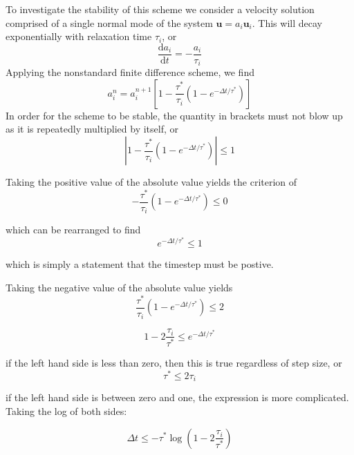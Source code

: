 \documentclass[preprint,12pt,authoryear]{elsarticle}
\newif\ifdetail
\begin{document}
To investigate the stability of this scheme we consider a velocity solution comprised of 
a single normal mode of the system $\mathbf{u} = a_i \mathbf{u}_i$.
This will decay exponentially with relaxation time $\tau_i$, or
\begin{equation}
\frac{\text{d} a_i} {\text{d}t} = - \frac{ a_i }{\tau_i} 
\end{equation}
Applying the nonstandard finite difference scheme, we find
\begin{equation}
a_i^{n} = a_i^{n+1} \left[ 1 - \frac{\tau^*}{\tau_i} \left(1-e^{-\Delta t/\tau^*} \right) \right]
\label{eq:recursion}
\end{equation}
In order for the scheme to be stable, the quantity in brackets must not blow up as it is repeatedly multiplied by itself, or 
\begin{equation}
\left| 1 - \frac{\tau^*}{\tau_i} \left(1-e^{-\Delta t/\tau^*} \right) \right| \le 1
\end{equation}

\ifdetail
Taking the positive value of the absolute value yields the criterion of 
\begin{equation}
- \frac{\tau^*}{\tau_i} \left(1-e^{-\Delta t/\tau^*} \right) \le 0
\end{equation}

which can be rearranged to find
\begin{equation}
e^{-\Delta t/\tau^*} \le 1
\end{equation}

which is simply a statement that the timestep must be postive.

Taking the negative value of the absolute value yields
\begin{equation}
  \frac{\tau^*}{\tau_i} \left(1-e^{-\Delta t/\tau^*} \right)  \le 2
\end{equation}

\begin{equation}
 1 - 2 \frac{\tau_i}{\tau^*} \le e^{-\Delta t/\tau^*}
\end{equation}

if the left hand side is less than zero, then this is true regardless of step size, or
\begin{equation}
\tau^* \le 2 \tau_i
\end{equation}

if the left hand side is between zero and one, the expression is more complicated. 
Taking the log of both sides:

\begin{equation}
\Delta t \le -\tau^* \log \left(1 - 2 \frac{\tau_i}{\tau^*} \right)
\end{equation}
\end{document}
